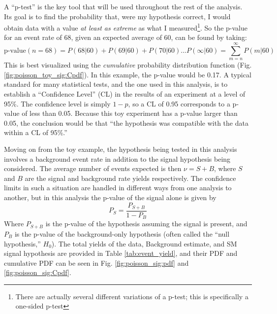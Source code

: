     \FloatBarrier
    A ``p-test'' is the key tool that will be used throughout the rest of the analysis.
    Its goal is to find the probability that, were my hypothesis correct,
        I would obtain data with a value \textit{at least as extreme} as what I measured\footnote{
            There are actually several different variations of a p-test;
            this is specifically a one-sided p-test}.
    So the p-value for an event rate of 68, given an expected average of 60, can be found by taking:
    \begin{equation}
        \textrm{p-value}(n=68) = P(68|60) + P(69|60) + P(70|60) ... P(\infty|60) = \sum\limits_{m=n}^\infty P(m|60)
    \end{equation}
    This is best visualized using the \textit{cumulative} probability distribution function (Fig. \ref{fig:poisson_toy_sig:Cpdf}).
    In this example, the p-value would be 0.17.
    A typical standard for many statistical tests, and the one used in this analysis,
        is to establish a ``Confidence Level'' (CL) in the results of an experiment at a level of 95\%. 
    The confidence level is simply $1-p$, so a CL of 0.95 corresponds to a p-value of less than 0.05.
    Because this toy experiment has a p-value larger than 0.05,
        the conclusion would be that ``the hypothesis was compatible with the data within a CL of 95\%.''


    Moving on from the toy example, the hypothesis being tested in this analysis
        involves a background event rate in addition to the signal hypothesis being considered.
    The average number of events expected is then $\nu = S + B$,
        where $S$ and $B$ are the signal and background rate yields respectively.
    The confidence limits in such a situation are handled in different ways from one analysis to another,
        but in this analysis the p-value of the signal alone is given by
    \begin{equation}
        P_S = \frac{P_{S+B}}{1 - P_B}
    \end{equation}
    Where $P_{S+B}$ is the p-value of the hypothesis assuming the signal is present,
        and $P_B$ is the p-value of the background-only hypothesis
        (often called the ``null hypothesis,'' $H_0$)\cite{Barlow:2019svl}.
    The total yields of the data, Background estimate, and SM signal hypothesis are provided in Table \ref{tab:event_yield},
        and their PDF and cumulative PDF can be seen in
        Fig. \ref{fig:poisson_sig:pdf} and \ref{fig:poisson_sig:Cpdf}.

